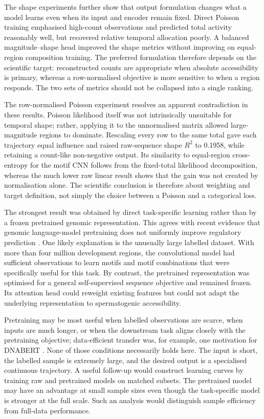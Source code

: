 \documentclass[a4paper,12pt]{article}
\begin{document}
The shape experiments further show that output formulation changes what a model learns even when its input and encoder remain fixed. Direct Poisson training emphasised high-count observations and predicted total activity reasonably well, but recovered relative temporal allocation poorly. A balanced magnitude--shape head improved the shape metrics without improving on equal-region composition training. The preferred formulation therefore depends on the scientific target: reconstructed counts are appropriate when absolute accessibility is primary, whereas a row-normalised objective is more sensitive to when a region responds. The two sets of metrics should not be collapsed into a single ranking.

The row-normalised Poisson experiment resolves an apparent contradiction in these results. Poisson likelihood itself was not intrinsically unsuitable for temporal shape; rather, applying it to the unnormalised matrix allowed large-magnitude regions to dominate. Rescaling every row to the same total gave each trajectory equal influence and raised raw-sequence shape $R^2$ to 0.1958, while retaining a count-like non-negative output. Its similarity to equal-region cross-entropy for the motif CNN follows from the fixed-total likelihood decomposition, whereas the much lower raw linear result shows that the gain was not created by normalisation alone. The scientific conclusion is therefore about weighting and target definition, not simply the choice between a Poisson and a categorical loss.

The strongest result was obtained by direct task-specific learning rather than by a frozen pretrained genomic representation. This agrees with recent evidence that genomic language-model pretraining does not uniformly improve regulatory prediction \citep{patel2024darteval}. One likely explanation is the unusually large labelled dataset. With more than four million development regions, the convolutional model had sufficient observations to learn motifs and motif combinations that were specifically useful for this task. By contrast, the pretrained representation was optimised for a general self-supervised sequence objective and remained frozen. Its attention head could reweight existing features but could not adapt the underlying representation to spermatogenic accessibility.

Pretraining may be most useful when labelled observations are scarce, when inputs are much longer, or when the downstream task aligns closely with the pretraining objective; data-efficient transfer was, for example, one motivation for DNABERT \citep{ji2021dnabert}. None of those conditions necessarily holds here. The input is short, the labelled sample is extremely large, and the desired output is a specialised continuous trajectory. A useful follow-up would construct learning curves by training raw and pretrained models on matched subsets. The pretrained model may have an advantage at small sample sizes even though the task-specific model is stronger at the full scale. Such an analysis would distinguish sample efficiency from full-data performance.
\end{document}
